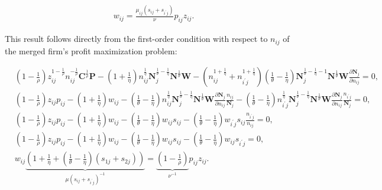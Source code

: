 \documentclass[12pt]{article}
\theoremstyle{prop}
\begin{document}
\begin{equation*}
    \begin{aligned}
        w_{ij} = \frac{\mu_{ij}(s_{ij} + s_{i^\prime j})}{\nu} p_{ij} z_{ij}.      
    \end{aligned}
\end{equation*}

This result follows directly from the first-order condition with respect to $n_{ij}$ of the merged firm's profit maximization problem:

\begin{equation*}
    \begin{aligned}
        &\left(1-\frac{1}{\rho}\right) z_{ij}^{1-\frac{1}{\rho}} n_{ij}^{-\frac{1}{\rho}} \mathbf{C}^{\frac{1}{\rho}} \mathbf{P} - \left(1+\frac{1}{\eta}\right) n_{ij}^{\frac{1}{\eta}} \textbf{N}_{j}^{\frac{1}{\theta} - \frac{1}{\eta}} \textbf{N}^{\frac{1}{\theta}} \textbf{W} - \left(n_{ij}^{1+\frac{1}{\eta}} + n_{i^\prime j}^{1+\frac{1}{\eta}} \right) \left(\frac{1}{\theta} - \frac{1}{\eta}\right) \textbf{N}_{j}^{\frac{1}{\theta} - \frac{1}{\eta} - 1} \textbf{N}^{\frac{1}{\theta}} \textbf{W}  \frac{\partial \textbf{N}_{j}}{\partial n_{ij}} = 0,\\
        &\left(1-\frac{1}{\rho}\right) z_{ij} p_{ij} - \left(1+\frac{1}{\eta}\right) w_{ij} - \left(\frac{1}{\theta} - \frac{1}{\eta}\right) n_{ij}^{\frac{1}{\eta}} \textbf{N}_{j}^{\frac{1}{\theta} - \frac{1}{\eta}} \textbf{N}^{\frac{1}{\theta}} \textbf{W} \frac{\partial \textbf{N}_{j}}{\partial n_{ij}} \frac{n_{ij}}{\textbf{N}_{j}} - \left(\frac{1}{\theta} - \frac{1}{\eta}\right) n_{i^\prime j}^{\frac{1}{\eta}} \textbf{N}_{j}^{\frac{1}{\theta} - \frac{1}{\eta}} \textbf{N}^{\frac{1}{\theta}} \textbf{W} \frac{\partial \textbf{N}_{j}}{\partial n_{ij}} \frac{n_{i^\prime j}}{\textbf{N}_{j}} = 0,\\
        &\left(1-\frac{1}{\rho}\right) z_{ij} p_{ij} - \left(1+\frac{1}{\eta}\right) w_{ij} - \left(\frac{1}{\theta} - \frac{1}{\eta}\right) w_{ij} s_{ij} - \left(\frac{1}{\theta} - \frac{1}{\eta}\right) w_{i^\prime j} s_{ij} \frac{n_{i^\prime j}}{n_{ij}} = 0,\\
        &\left(1-\frac{1}{\rho}\right) z_{ij} p_{ij} - \left(1+\frac{1}{\eta}\right) w_{ij} - \left(\frac{1}{\theta} - \frac{1}{\eta}\right) w_{ij} s_{ij} - \left(\frac{1}{\theta} - \frac{1}{\eta}\right) w_{ij} s_{i^\prime j} = 0, \\             
        &w_{ij} \underbrace{\left(1 + \frac{1}{\eta} + \left(\frac{1}{\theta} - \frac{1}{\eta}\right) \left(s_{1j} + s_{2j}\right)\right)}_{\mu(s_{ij} + s_{i^\prime j})^{-1}} = \underbrace{\left(1-\frac{1}{\rho}\right)}_{\nu^{-1}} p_{ij}  z_{ij}. 
    \end{aligned}
\end{equation*}
\end{document}
